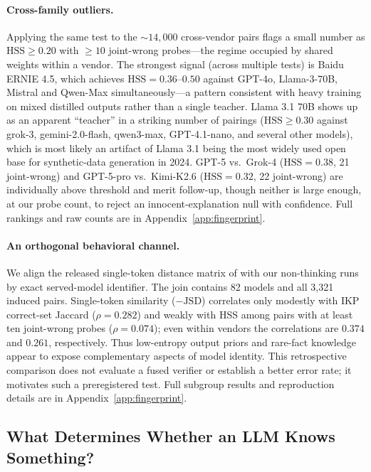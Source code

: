 \documentclass[11pt]{article}
\begin{document}
\paragraph{Cross-family outliers.} Applying the same test to the ${\sim}14{,}000$ cross-vendor pairs flags a small number as $\mathrm{HSS} \geq 0.20$ with $\geq 10$ joint-wrong probes---the regime occupied by shared weights within a vendor. The strongest signal (across multiple tests) is Baidu ERNIE 4.5, which achieves $\mathrm{HSS} = 0.36$--$0.50$ against GPT-4o, Llama-3-70B, Mistral and Qwen-Max simultaneously---a pattern consistent with heavy training on mixed distilled outputs rather than a single teacher. Llama 3.1 70B shows up as an apparent ``teacher'' in a striking number of pairings ($\mathrm{HSS} \geq 0.30$ against grok-3, gemini-2.0-flash, qwen3-max, GPT-4.1-nano, and several other models), which is most likely an artifact of Llama 3.1 being the most widely used open base for synthetic-data generation in 2024. GPT-5 vs.\ Grok-4 ($\mathrm{HSS} = 0.38$, 21 joint-wrong) and GPT-5-pro vs.\ Kimi-K2.6 ($\mathrm{HSS} = 0.32$, 22 joint-wrong) are individually above threshold and merit follow-up, though neither is large enough, at our probe count, to reject an innocent-explanation null with confidence. Full rankings and raw counts are in Appendix~\ref{app:fingerprint}.

\paragraph{An orthogonal behavioral channel.} We align the released single-token distance matrix of \citet{bruckner2026onetoken} with our non-thinking runs by exact served-model identifier. The join contains 82 models and all 3,321 induced pairs. Single-token similarity ($-\mathrm{JSD}$) correlates only modestly with IKP correct-set Jaccard ($\rho=0.282$) and weakly with HSS among pairs with at least ten joint-wrong probes ($\rho=0.074$); even within vendors the correlations are $0.374$ and $0.261$, respectively. Thus low-entropy output priors and rare-fact knowledge appear to expose complementary aspects of model identity. This retrospective comparison does not evaluate a fused verifier or establish a better error rate; it motivates such a preregistered test. Full subgroup results and reproduction details are in Appendix~\ref{app:fingerprint}.

\subsection{What Determines Whether an LLM Knows Something?}
\label{sec:recognition}
\end{document}
